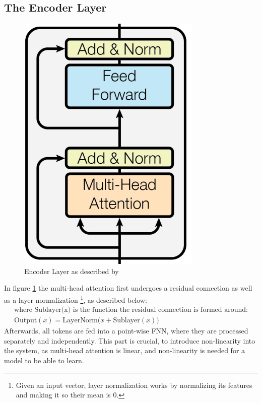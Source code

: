\documentclass{article}
\begin{document}
\subsection{The Encoder Layer}
\begin{figure}
    \centering
    \includegraphics[width=0.2\paperwidth]{images/encodingLayer.png}
    \caption{Encoder Layer as described by \cite{vaswani2023attentionneed}}
    \label{fig:encodingLayer}
\end{figure}
In figure \ref{fig:encodingLayer} the multi-head attention first undergoes a residual connection as well as a layer normalization \footnote{Given an input vector, layer normalization works by normalizing its features and making it so their mean is 0.}, as described below:
\begin{gather}
    \text{where Sublayer(x) is the function the residual connection is formed around:} \nonumber \\
    \text{Output}(x) = \text{LayerNorm}\bigl(x + \text{Sublayer}(x)\bigr) \label{eq:ResConnect}
\end{gather}
Afterwards, all tokens are fed into a point-wise FNN, where they are processed separately and independently. This part is crucial, to introduce non-linearity into the system, as multi-head attention is linear, and non-linearity is needed for a model to be able to learn.
\end{document}

